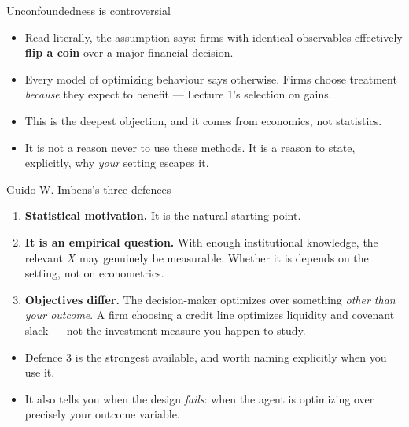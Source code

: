 \documentclass[
  11pt,
  ignorenonframetext,
  aspectratio=169,
]{beamer}
\providecommand{\tightlist}{%
  \setlength{\itemsep}{0pt}\setlength{\parskip}{0pt}}
\begin{document}
\begin{frame}{Unconfoundedness is controversial}
\protect{}\label{unconfoundedness-is-controversial}
\begin{itemize}
\tightlist
\item
  Read literally, the assumption says: firms with identical observables
  effectively \textbf{flip a coin} over a major financial decision.
\item
  Every model of optimizing behaviour says otherwise. Firms choose
  treatment \emph{because} they expect to benefit --- Lecture 1's
  selection on gains.
\item
  This is the deepest objection, and it comes from economics, not
  statistics.
\item
  It is not a reason never to use these methods. It is a reason to
  state, explicitly, why \emph{your} setting escapes it.
\end{itemize}
\end{frame}

\begin{frame}{Guido W. Imbens's three defences}
\protect{}\label{guido-w.-imbenss-three-defences}
\begin{enumerate}
\tightlist
\item
  \textbf{Statistical motivation.} It is the natural starting point.
\item
  \textbf{It is an empirical question.} With enough institutional
  knowledge, the relevant \(X\) may genuinely be measurable. Whether it
  is depends on the setting, not on econometrics.
\item
  \textbf{Objectives differ.} The decision-maker optimizes over
  something \emph{other than your outcome}. A firm choosing a credit
  line optimizes liquidity and covenant slack --- not the investment
  measure you happen to study.
\end{enumerate}

\vspace{0.3em}

\begin{itemize}
\tightlist
\item
  Defence 3 is the strongest available, and worth naming explicitly when
  you use it.
\item
  It also tells you when the design \emph{fails}: when the agent is
  optimizing over precisely your outcome variable.
\end{itemize}
\end{frame}
\end{document}
